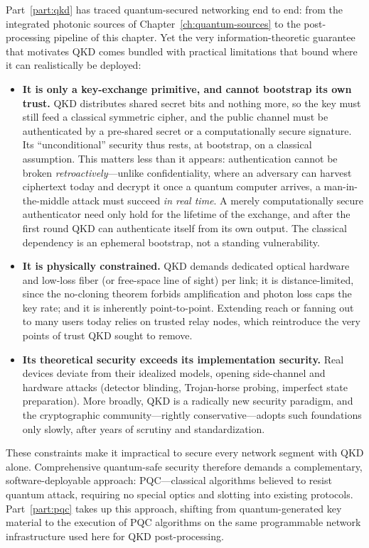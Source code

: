 Part~\ref{part:qkd} has traced quantum-secured networking end to end: from the integrated photonic sources of Chapter~\ref{ch:quantum-sources} to the post-processing pipeline of this chapter. Yet the very information-theoretic guarantee that motivates QKD comes bundled with practical limitations that bound where it can realistically be deployed:
\begin{itemize}
    \item \textbf{It is only a key-exchange primitive, and cannot bootstrap its own trust.} QKD distributes shared secret bits and nothing more, so the key must still feed a classical symmetric cipher, and the public channel must be authenticated by a pre-shared secret or a computationally secure signature. Its ``unconditional'' security thus rests, at bootstrap, on a classical assumption. This matters less than it appears: authentication cannot be broken \emph{retroactively}---unlike confidentiality, where an adversary can harvest ciphertext today and decrypt it once a quantum computer arrives, a man-in-the-middle attack must succeed \emph{in real time}. A merely computationally secure authenticator need only hold for the lifetime of the exchange, and after the first round QKD can authenticate itself from its own output. The classical dependency is an ephemeral bootstrap, not a standing vulnerability.
    \item \textbf{It is physically constrained.} QKD demands dedicated optical hardware and low-loss fiber (or free-space line of sight) per link; it is distance-limited, since the no-cloning theorem forbids amplification and photon loss caps the key rate; and it is inherently point-to-point. Extending reach or fanning out to many users today relies on trusted relay nodes, which reintroduce the very points of trust QKD sought to remove.
    \item \textbf{Its theoretical security exceeds its implementation security.} Real devices deviate from their idealized models, opening side-channel and hardware attacks (detector blinding, Trojan-horse probing, imperfect state preparation). More broadly, QKD is a radically new security paradigm, and the cryptographic community---rightly conservative---adopts such foundations only slowly, after years of scrutiny and standardization.
\end{itemize}

These constraints make it impractical to secure every network segment with QKD alone. Comprehensive quantum-safe security therefore demands a complementary, software-deployable approach: PQC---classical algorithms believed to resist quantum attack, requiring no special optics and slotting into existing protocols. Part~\ref{part:pqc} takes up this approach, shifting from quantum-generated key material to the execution of PQC algorithms on the same programmable network infrastructure used here for QKD post-processing.
